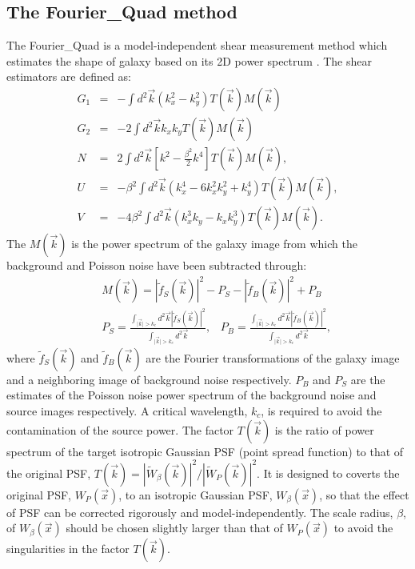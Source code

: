 \documentclass[twocolumn]{aastex62}
\begin{document}
\subsection{The Fourier\_Quad method}\label{sec:FQ}
The Fourier\_Quad is a model-independent shear measurement method which estimates the shape of galaxy based on its 2D power spectrum \citep{Zhang2008, Zhang2015, Zhang2017}. The shear estimators are defined as:
\begin{eqnarray}
\label{shear_estimator}
G_1&=&-\int d^2\vec{k}(k_x^2-k_y^2)T(\vec{k})M(\vec{k})\\ \nonumber
G_2&=&-2\int d^2\vec{k}k_xk_yT(\vec{k})M(\vec{k})\\ \nonumber
N&=&2\int d^2\vec{k}\left[k^2-\frac{\beta^2}{2}k^4\right]T(\vec{k})M(\vec{k}), \\ \nonumber
U &=& -\beta^2\int d^2\vec{k}(k_x^4 - 6k_x^2k_y^2 + k_y^4)T(\vec{k})M(\vec{k}), \\ \nonumber
V &=& -4\beta^2\int d^2\vec{k}(k_x^3k_y - k_xk_y^3)T(\vec{k})M(\vec{k}).
\end{eqnarray}
The $M(\vec{k})$ is the power spectrum of the galaxy image from which the background and Poisson noise have been subtracted through:
\begin{eqnarray}
\label{FQ_TM}
&&M(\vec{k})=\left\vert\widetilde{f}_S(\vec{k})\right\vert^2-P_S-\left\vert\widetilde{f}_B(\vec{k})\right\vert^2+P_B\\ \nonumber
&&P_S=\frac{\int_{\vert\vec{k}\vert > k_c} d^2\vec{k}\left\vert\widetilde{f}_S(\vec{k})\right\vert^2}{\int_{\vert\vec{k}\vert > k_c} d^2\vec{k}}, \;\;\; P_B=\frac{\int_{\vert\vec{k}\vert > k_c} d^2\vec{k}\left\vert\widetilde{f}_B(\vec{k})\right\vert^2}{\int_{\vert\vec{k}\vert > k_c} d^2\vec{k}},
\end{eqnarray}
where $\widetilde{f}_S(\vec{k})$ and $\widetilde{f}_B(\vec{k})$ are the Fourier transformations of the galaxy image and a neighboring image of background noise respectively. $P_B$ and $P_S$ are the estimates of the Poisson noise power spectrum of the background noise and source images respectively. A critical wavelength, $k_c$, is required to avoid the contamination of the source power\citep{Zhang2015}. The factor $T(\vec{k})$ is the ratio of power spectrum of the target isotropic Gaussian PSF (point spread function) to that of the original PSF, $T(\vec{k}) = |\widetilde{W}_{\beta}(\vec{k})|^2/|\widetilde{W}_{P}(\vec{k})|^2$.
It is designed to coverts the original PSF, $W_{P}(\vec{x})$, to an isotropic Gaussian PSF, $W_{\beta}(\vec{x})$, so that the effect of PSF can be corrected rigorously and model-independently.
The scale radius, $\beta$, of $W_{\beta}(\vec{x})$ should be chosen slightly larger than that of $W_{P}(\vec{x})$ to avoid the singularities in the factor $T(\vec{k})$. 
\end{document}
